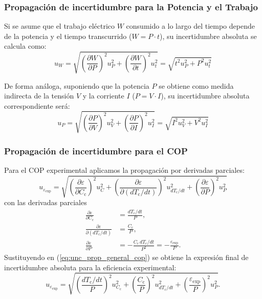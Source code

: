 \documentclass[a4paper,11pt]{article}
\begin{document}
\subsubsection{Propagación de incertidumbre para la Potencia y el Trabajo}
Si se asume que el trabajo eléctrico $W$ consumido a lo largo del tiempo depende de la potencia y el tiempo transcurrido ($W = P \cdot t$), su incertidumbre absoluta se calcula como:
\begin{equation}
u_W = \sqrt{\left(\frac{\partial W}{\partial P}\right)^2 u_P^2 + \left(\frac{\partial W}{\partial t}\right)^2 u_t^2} = \sqrt{t^2 u_P^2 + P^2 u_t^2}
\end{equation}

De forma análoga, suponiendo que la potencia $P$ se obtiene como medida indirecta de la tensión $V$ y la corriente $I$ ($P = V \cdot I$), su incertidumbre absoluta correspondiente será:
\begin{equation}
u_P = \sqrt{\left(\frac{\partial P}{\partial V}\right)^2 u_V^2 + \left(\frac{\partial P}{\partial I}\right)^2 u_I^2} = \sqrt{I^2 u_V^2 + V^2 u_I^2}
\end{equation}

\subsubsection{Propagación de incertidumbre para el COP}
Para el COP experimental aplicamos la propagación por derivadas parciales:
\begin{equation}
u_{\varepsilon_{\mathrm{exp}}}=\sqrt{\left(\frac{\partial\varepsilon}{\partial C_{\mathrm{c}}}\right)^2 u_C^2
 +\left(\frac{\partial\varepsilon}{\partial (dT_{\mathrm{c}}/dt)}\right)^2 u_{dT_{\mathrm{c}}/dt}^2
 +\left(\frac{\partial\varepsilon}{\partial P}\right)^2 u_P^2}
\label{eq:unc_prop_general_cop}
\end{equation}
con las derivadas parciales
\begin{align}
\frac{\partial\varepsilon}{\partial C_{\mathrm{c}}}&=\frac{dT_{\mathrm{c}}/dt}{P}, \\
\frac{\partial\varepsilon}{\partial (dT_{\mathrm{c}}/dt)}&=\frac{C_{\mathrm{c}}}{P}, \\
\frac{\partial\varepsilon}{\partial P}&=-\frac{C_{\mathrm{c}}\,dT_{\mathrm{c}}/dt}{P^2}=-\frac{\varepsilon_{\mathrm{exp}}}{P}.
\end{align}
Sustituyendo en (\ref{eq:unc_prop_general_cop}) se obtiene la expresión final de incertidumbre absoluta para la eficiencia experimental:
\begin{equation}
u_{\varepsilon_{\mathrm{exp}}}=\sqrt{\left(\frac{dT_{\mathrm{c}}/dt}{P}\right)^2 u_{C_\mathrm{c}}^2
 +\left(\frac{C_{\mathrm{c}}}{P}\right)^2 u_{dT_{\mathrm{c}}/dt}^2 +\left(\frac{\varepsilon_{\mathrm{exp}}}{P}\right)^2 u_P^2 }.
\label{eq:unc_exp}
\end{equation}
\end{document}

